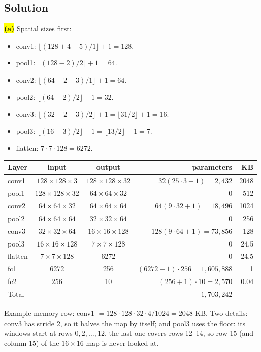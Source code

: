 \documentclass[12pt,a4paper]{article}
\newcommand{\hlq}[1]{{\setlength{\fboxsep}{1.5pt}\colorbox{yellow}{#1}}}
\begin{document}
\subsection*{Solution}
\hlq{\textbf{(a)}} Spatial sizes first:
\begin{itemize}[nosep]
\item conv1: $\lfloor(128+4-5)/1\rfloor+1=128$.
\item pool1: $\lfloor(128-2)/2\rfloor+1=64$.
\item conv2: $\lfloor(64+2-3)/1\rfloor+1=64$.
\item pool2: $\lfloor(64-2)/2\rfloor+1=32$.
\item conv3: $\lfloor(32+2-3)/2\rfloor+1=\lfloor31/2\rfloor+1=16$.
\item pool3: $\lfloor(16-3)/2\rfloor+1=\lfloor13/2\rfloor+1=7$.
\item flatten: $7\cdot7\cdot128=6272$.
\end{itemize}
\begin{center}
\begin{tabular}{@{}lccr r@{}}
\toprule
Layer & input & output & parameters & KB\\
\midrule
conv1 & $128\times128\times3$ & $128\times128\times32$ & $32(25\cdot3+1)=2{,}432$ & 2048\\
pool1 & $128\times128\times32$ & $64\times64\times32$ & 0 & 512\\
conv2 & $64\times64\times32$ & $64\times64\times64$ & $64(9\cdot32+1)=18{,}496$ & 1024\\
pool2 & $64\times64\times64$ & $32\times32\times64$ & 0 & 256\\
conv3 & $32\times32\times64$ & $16\times16\times128$ & $128(9\cdot64+1)=73{,}856$ & 128\\
pool3 & $16\times16\times128$ & $7\times7\times128$ & 0 & 24.5\\
flatten & $7\times7\times128$ & 6272 & 0 & 24.5\\
fc1 & 6272 & 256 & $(6272+1)\cdot256=1{,}605{,}888$ & 1\\
fc2 & 256 & 10 & $(256+1)\cdot10=2{,}570$ & 0.04\\
\midrule
Total & & & $1{,}703{,}242$ & \\
\bottomrule
\end{tabular}
\end{center}
Example memory row: conv1 $=128\cdot128\cdot32\cdot4/1024=2048$ KB. Two details: conv3 has stride 2, so it halves the map by itself; and pool3 uses the floor: its windows start at rows $0,2,\dots,12$, the last one covers rows 12--14, so row 15 (and column 15) of the $16\times16$ map is never looked at.
\end{document}
